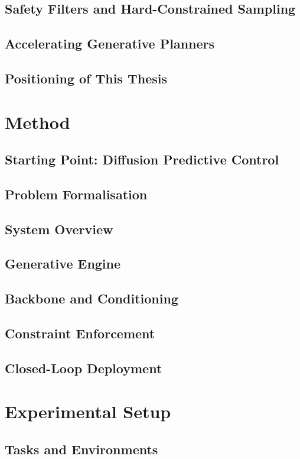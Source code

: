 \documentclass[headsepline,footsepline,footinclude=false,oneside,fontsize=11pt,paper=a4,listof=totoc,bibliography=totoc]{scrbook}
\begin{document}
\section{Safety Filters and Hard-Constrained Sampling}
\section{Accelerating Generative Planners}
\section{Positioning of This Thesis}

\chapter{Method}\label{ch:method}
\section{Starting Point: Diffusion Predictive Control}
\section{Problem Formalisation}
\section{System Overview}
\section{Generative Engine}
\section{Backbone and Conditioning}
\section{Constraint Enforcement}
\section{Closed-Loop Deployment}

\chapter{Experimental Setup}\label{ch:setup}
\section{Tasks and Environments}
\end{document}
